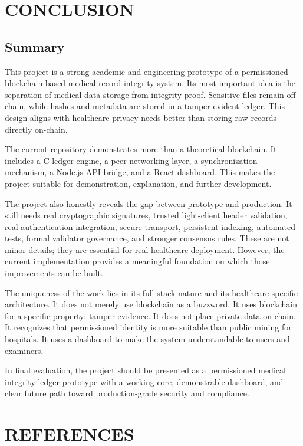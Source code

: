 \documentclass[12pt]{article}
\begin{document}
\newpage
\section{CONCLUSION}

\subsection{Summary}

This project is a strong academic and engineering prototype of a permissioned blockchain-based medical record integrity system. Its most important idea is the separation of medical data storage from integrity proof. Sensitive files remain off-chain, while hashes and metadata are stored in a tamper-evident ledger. This design aligns with healthcare privacy needs better than storing raw records directly on-chain.

The current repository demonstrates more than a theoretical blockchain. It includes a C ledger engine, a peer networking layer, a synchronization mechanism, a Node.js API bridge, and a React dashboard. This makes the project suitable for demonstration, explanation, and further development.

The project also honestly reveals the gap between prototype and production. It still needs real cryptographic signatures, trusted light-client header validation, real authentication integration, secure transport, persistent indexing, automated tests, formal validator governance, and stronger consensus rules. These are not minor details; they are essential for real healthcare deployment. However, the current implementation provides a meaningful foundation on which those improvements can be built.

The uniqueness of the work lies in its full-stack nature and its healthcare-specific architecture. It does not merely use blockchain as a buzzword. It uses blockchain for a specific property: tamper evidence. It does not place private data on-chain. It recognizes that permissioned identity is more suitable than public mining for hospitals. It uses a dashboard to make the system understandable to users and examiners.

In final evaluation, the project should be presented as a permissioned medical integrity ledger prototype with a working core, demonstrable dashboard, and clear future path toward production-grade security and compliance.

\newpage
{}
{}
\section*{REFERENCES}
\end{document}
